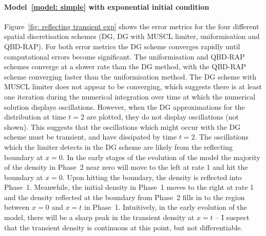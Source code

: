 \paragraph{Model~\ref{model: simple} with exponential initial condition}
Figure~\ref{fig: reflecting transient exp} shows the error metrics for the four different spatial discretisation schemes (DG, DG with MUSCL limiter, uniformisation and QBD-RAP). For both error metrics the DG scheme converges rapidly until computational errors become significant. The uniformisation and QBD-RAP schemes converge at a slower rate than the DG method, with the QBD-RAP scheme converging faster than the uniformisation method. The DG scheme with MUSCL limiter does not appear to be converging, which suggests there is at least one iteration during the numerical integration over time at which the numerical solution displays oscillations. However, when the DG approximations for the distribution at time \(t=2\) are plotted, they do not display oscillations (not shown). This suggests that the oscillations which might occur with the DG scheme must be transient, and have dissipated by time \(t=2\). The oscillations which the limiter detects in the DG scheme are likely from the reflecting boundary at \(x=0\). In the early stages of the evolution of the model the majority of the density in Phase~2 near zero will move to the left at rate 1 and hit the boundary at \(x=0\). Upon hitting the boundary, the density is reflected into Phase~1. Meanwhile, the initial density in Phase~1 moves to the right at rate 1 and the density reflected at the boundary from Phase~2 fills in to the region between \(x=0\) and \(x=t\) in Phase~1. Intuitively, in the early evolution of the model, there will be a sharp peak in the transient density at \(x=t\) -- I suspect that the transient density is continuous at this point, but not differentiable.  %
